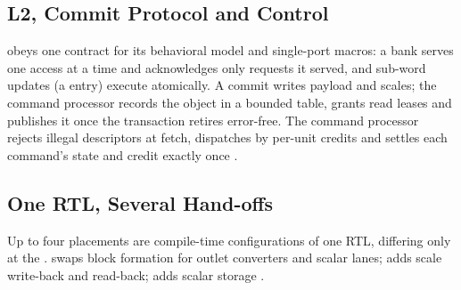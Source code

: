 \subsection{L2, Commit Protocol and Control}\label{sec:commit}

%
\Lii obeys one contract for its behavioral model and single-port macros: a bank serves one access at a time and acknowledges only requests it served, and sub-word updates (a \sidecar entry) execute atomically.
A commit writes payload and scales; the command processor records the object in a bounded table, grants read leases and publishes it once the transaction retires error-free.
The command processor rejects illegal descriptors at fetch, dispatches by per-unit credits and settles each command's state and credit exactly once
.

\subsection{One RTL, Several Hand-offs}\label{sec:one-rtl}

%
Up to four placements are compile-time configurations of one RTL, differing only at the \handoff.
\armSD swaps block formation for outlet converters and scalar lanes; \armBM adds scale write-back and read-back; \armSM adds scalar storage
.
